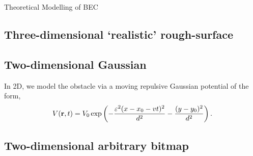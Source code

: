 \begin{chapter}{\label{cha:theoretical_model}Theoretical Modelling of BEC}
\subsection{\label{section:3dafmpotential} Three-dimensional `realistic' rough-surface}
\subsection{\label{section:2dobjpotential} Two-dimensional Gaussian}

In 2D, we model the obstacle via a moving repulsive Gaussian potential of the form,
\begin{equation}
V({\bf r}, t)=V_0 \exp \left( -\frac{\varepsilon^2(x-x_0-vt)^2}{d^2} -\frac{(y-y_0)^2}{d^2}\right).
\label{eq:potential2D}
\end{equation}




\subsection{\label{section:2dbitmappotential} Two-dimensional arbitrary bitmap}
\end{chapter}
